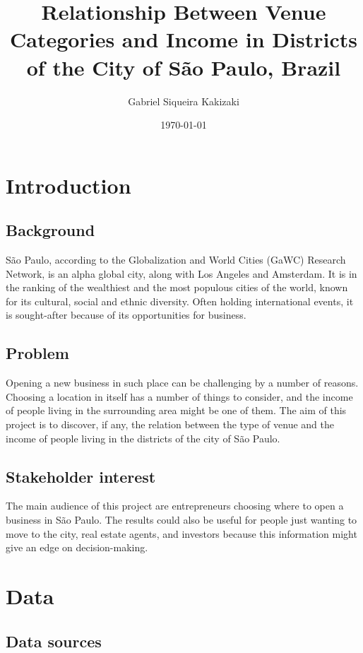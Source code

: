 \documentclass[12pt]{article}
\author{Gabriel Siqueira Kakizaki}
\date{\today}
\title{\textbf{Relationship Between Venue Categories and Income in Districts of
the City of São Paulo, Brazil}}
\begin{document}
\maketitle



\section{Introduction}

\subsection{Background}

São Paulo, according to the Globalization and World Cities (GaWC) Research
Network, is an alpha global city, along with Los Angeles and Amsterdam. It is
in the ranking of the wealthiest and the most populous cities of the world,
known for its cultural, social and ethnic diversity. Often holding
international events, it is sought-after because of its opportunities for
business.

\subsection{Problem}

Opening a new business in such place can be challenging by a number of reasons.
Choosing a location in itself has a number of things to consider, and the
income of people living in the surrounding area might be one of them. The aim
of this project is to discover, if any, the relation between the type of venue
and the income of people living in the districts of the city of São Paulo.

\subsection{Stakeholder interest}

The main audience of this project are entrepreneurs choosing where to open a
business in São Paulo. The results could also be useful for people just wanting
to move to the city, real estate agents, and investors because this information
might give an edge on decision-making.



\section{Data}

\subsection{Data sources}
\end{document}
